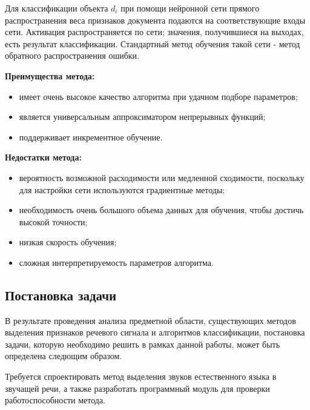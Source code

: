 \documentclass[utf8x, 14pt, oneside, a4paper]{article}
\begin{document}
	Для классификации объекта $d_i$ при помощи нейронной сети прямого распространения веса признаков документа подаются на соответствующие входы сети. Активация распространяется по сети; значения, получившиеся на выходах, есть результат классификации. Стандартный метод обучения такой сети - метод обратного распространения ошибки.
	
	\begin{flushleft}
		{\bf Преимущества метода:}
	\end{flushleft}
	
	\begin{itemize}
		\item имеет очень высокое качество алгоритма при удачном подборе параметров;
		\item является универсальным аппроксиматором непрерывных функций;
		\item поддерживает инкрементное обучение.
	\end{itemize}
	
	\begin{flushleft}
		{\bf Недостатки метода:}
	\end{flushleft}
	
	\begin{itemize}
		\item вероятность возможной расходимости или медленной сходимости, поскольку для настройки сети используются градиентные методы;
		\item необходимость очень большого объема данных для обучения, чтобы достичь высокой точности;
		\item низкая скорость обучения;
		\item сложная интерпретируемость параметров алгоритма.
	\end{itemize}
	
	\subsection{Постановка задачи}
	
	В результате проведения анализа предметной области, существующих методов выделения признаков речевого сигнала и алгоритмов классификации, постановка задачи, которую необходимо решить в рамках данной работы, может быть определена следющим образом.
	
	Требуется спроектировать метод выделения звуков естественного языка в звучащей речи, а также разработать программный модуль для проверки работоспособности метода.
	
\end{document}

